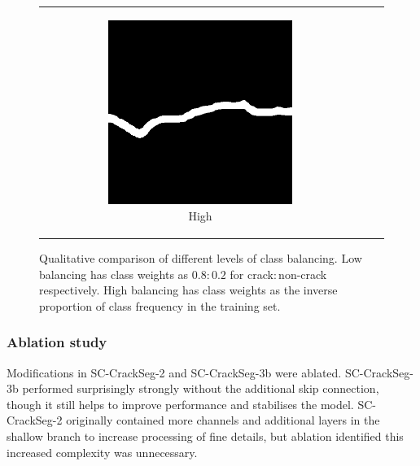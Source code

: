\documentclass[a4paper,12pt]{report}
\begin{document}
\begin{figure}[htbp]
\begin{tabular}{ccc}
\begin{subfigure}[b]{0.3\textwidth}
        \end{subfigure}
        \begin{subfigure}[b]{0.3\textwidth}
            \centering
            \includegraphics[width=0.75\textwidth]{res/class-balancing-comparison/sc-crackseg-high}
            \caption{High}
            \label{fig:crackseg-class-balancing-high}
        \end{subfigure}
    \end{tabular}
    \caption{Qualitative comparison of different levels of class balancing. Low balancing has class weights as $0.8:0.2$ for crack$:$non-crack respectively. High balancing has class weights as the inverse proportion of class frequency in the training set.}
    \label{fig:crackseg-class-balancing}
\end{figure}

\subsubsection*{Ablation study}

Modifications in SC-CrackSeg-2 and SC-CrackSeg-3b were ablated. SC-CrackSeg-3b performed surprisingly strongly without the additional skip connection, though it still helps to improve performance and stabilises the model. SC-CrackSeg-2 originally contained more channels and additional layers in the shallow branch to increase processing of fine details, but ablation identified this increased complexity was unnecessary.
\end{document}
